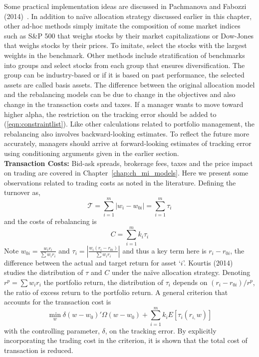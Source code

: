 Some practical implementation ideas are discussed in Pachmanova and Fabozzi (2014)~\cite{pachfab}. In addition to na\"ive allocation strategy discussed earlier in this chapter, other ad-hoc methods simply imitate the composition of some market indices such as S\&P 500 that weighs stocks by their market capitalizations or Dow-Jones that weighs stocks by their prices. To imitate, select the stocks with the largest weights in the benchmark. Other methods include stratification of benchmarks into groups and select stocks from each group that ensures diversification. The group can be industry-based or if it is based on past performance, the selected assets are called basis assets. The difference between the original allocation model and the rebalancing models can be due to change in the objectives and also change in the transaction costs and taxes. If a manager wants to move toward higher alpha, the restriction on the tracking error should be added to (\ref{eqn:constraintlist}). Like other calculations related to portfolio management, the rebalancing also involves backward-looking estimates. To reflect the future more accurately, managers should arrive at forward-looking estimates of tracking error using conditioning arguments given in the earlier section. \\


\noindent\textbf{Transaction Costs:} Bid-ask spreads, brokerage fees, taxes and the price impact on trading are covered in Chapter~\ref{chap:ch_mi_models}. Here we present some observations related to trading costs as noted in the literature. Defining the turnover as,
	\begin{equation}\label{eqn:turnover}
	\mathcal{T}= \sum_{i=1}^m |w_i - w_{0i}| = \sum_{i=1}^m \tau_i
	\end{equation}
and the costs of rebalancing is
	\begin{equation}\label{eqn:rebalance}
	C= \sum_{i=1}^m k_i \tau_i
	\end{equation}
Note $w_{0i}=\frac{w_i r_i}{\sum w_i r_i}$ and $\tau_i= \left|\frac{w_i(r_i-r_{0i})}{\sum w_ir_i}\right|$ and thus a key term here is $r_i-r_{0i}$, the difference between the actual and target return for asset `$i$'. Kourtis (2014)~\cite{kourtis} studies the distribution of $\tau$ and $C$ under the na\"ive allocation strategy. Denoting $r^p=\sum w_ir_i$ the portfolio return, the distribution of $\tau_i$ depends on $(r_i-r_{0i})/r^p$, the ratio of excess return to the portfolio return. A general criterion that accounts for the transaction cost is
	\begin{equation}\label{eqn:transcostaccount}
	\min_w \delta (w-w_0)' \Omega(w-w_0) + \sum_{i=1}^m k_i E[\tau_i (r_{i,}w)]
	\end{equation}
with the controlling parameter, $\delta$, on the tracking error. By explicitly incorporating the trading cost in the criterion, it is shown that the total cost of transaction is reduced.


